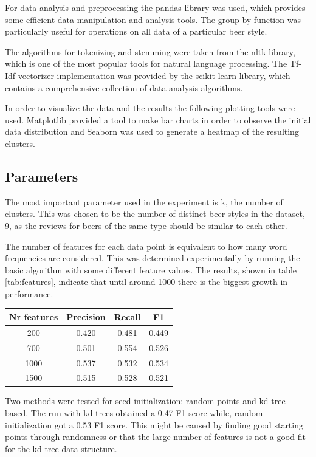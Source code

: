 \documentclass[12pt]{article}
\begin{document}
	For data analysis and preprocessing the pandas\cite{Pandas} library was used, which provides some efficient data manipulation and analysis tools. The group by function was particularly useful for operations on all data of a particular beer style. 
	
	The algorithms for tokenizing and stemming were taken from the nltk library\cite{NLTK}, which is one of the most popular tools for natural language processing. The Tf-Idf vectorizer implementation was provided by the scikit-learn library\cite{sk-learn}, which contains a comprehensive collection of data analysis algorithms.
	
	In order to visualize the data and the results the following plotting tools were used. Matplotlib\cite{Matplotlib} provided a tool to make bar charts in order to observe the initial data distribution and Seaborn\cite{Seaborn} was used to generate a heatmap of the resulting clusters.
		
	\subsection{Parameters}
	The most important parameter used in the experiment is k, the number of clusters. This was chosen to be the number of distinct beer styles in the dataset, 9, as the reviews for beers of the same type should be similar to each other.
	
	The number of features for each data point is equivalent to how many word frequencies are considered. This was determined experimentally by running the basic algorithm with some different feature values. The results, shown in table \ref{tab:features}, indicate that until around 1000 there is the biggest growth in performance.
	
	\begin{center}
		\label{tab:features}
		\begin{tabular}{ |c|c|c|c| } 
			\hline
			Nr features & Precision & Recall & F1 \\
			\hline
			200 & 0.420 & 0.481 & 0.449 \\
			700 & 0.501 & 0.554 & 0.526 \\
			1000 & 0.537 & 0.532 & 0.534 \\
			1500 & 0.515 & 0.528 & 0.521 \\
			\hline
		\end{tabular}
	\end{center}

	Two methods were tested for seed initialization: random points and kd-tree based. The run with kd-trees obtained a 0.47 F1 score while, random initialization got a 0.53 F1 score. This might be caused by finding good starting points through randomness or that the large number of features is not a good fit for the kd-tree data structure.
\end{document}

